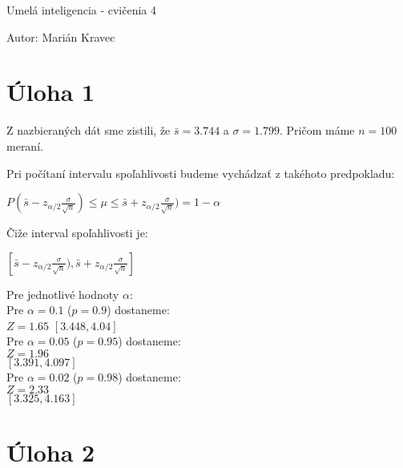 \documentclass[a4paper]{article}
\begin{document}
 
	
\pagestyle{plain}

\begin{center}
	\sc\large
	Umelá inteligencia - cvičenia 4
\end{center}

Autor: Marián Kravec

\section{Úloha 1}

Z nazbieraných dát sme zistili, že $\bar{s} = 3.744$ a $\sigma = 1.799$. Pričom máme $n = 100$ meraní.

Pri počítaní intervalu spoľahlivosti budeme vychádzať z takéhoto predpokladu:

$P(\bar{s} - z_{\alpha/2}\frac{\sigma}{\sqrt{n}}) \leq \mu \leq \bar{s} + z_{\alpha/2}\frac{\sigma}{\sqrt{n}}) = 1-\alpha$

Čiže interval spoľahlivosti je:

$[\bar{s} - z_{\alpha/2}\frac{\sigma}{\sqrt{n}}), \bar{s} + z_{\alpha/2}\frac{\sigma}{\sqrt{n}}]$

Pre jednotlivé hodnoty $\alpha$:
\\

Pre $\alpha = 0.1$ ($p=0.9$) dostaneme:
\\
$Z=1.65$
$[3.448, 4.04]$
\\

Pre $\alpha = 0.05$ ($p=0.95$) dostaneme:
\\
$Z=1.96$
\\
$[3.391, 4.097]$
\\

Pre $\alpha = 0.02$ ($p=0.98$) dostaneme:
\\
$Z=2.33$
\\
$[3.325, 4.163]$

\section{Úloha 2}
\end{document}
